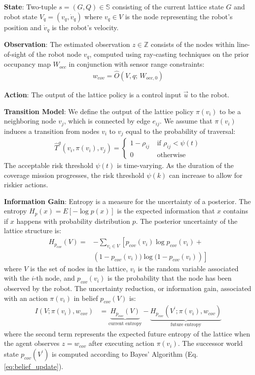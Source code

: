 \documentclass[letterpaper]{article} %
\newcommand{\ph}[1]{{\textbf{#1}:}} %
\begin{document}
\ph{State} Two-tuple $s=(G, Q)  \in \mathbb{S}$ consisting of the current lattice state $G$ and robot state $V_q = (v_q, \dot{v}_q)$ where $v_q \in V$ is the node representing the robot's position and $\dot{v}_q$ is the robot's velocity. 

\ph{Observation} The estimated observation $z \in \mathbb{Z}$ consists of the nodes within line-of-sight of the robot node $v_q$, computed using ray-casting techniques on the prior occupancy map $W_{occ}$ in conjunction with sensor range constraints:
\begin{align}
    w_{cov} = \hat{O}(V, q; \, W_{occ,0}) 
\end{align}

\ph{Action} The output of the lattice policy is a control input $\vec{u}$ to the robot. 

\ph{Transition Model} We define the output of the lattice policy $\pi(v_i)$ to be a neighboring node $v_j$, which is connected by edge $e_{ij}$. We assume that $\pi(v_i)$ induces a transition from nodes $v_i$ to $v_j$ equal to the probability of traversal:
\begin{align}
    \hat{T}^{g} (v_i, \pi(v_i), v_j) = \begin{cases} 
    1-\rho_{ij} \; &\text{if $\rho_{ij} < \psi(t)$}\\
    0 \; &\text{otherwise}
    \end{cases}
\end{align}
The acceptable risk threshold $\psi(t)$ is time-varying. As the duration of the coverage mission progresses, the risk threshold $\psi(k)$ can increase to allow for riskier actions.

\ph{Information Gain} Entropy is a measure for the uncertainty of a posterior. The entropy $H_p(x) = E[-\log p(x)]$ is the expected information that $x$ contains if $x$ happens with probability distribution $p$. The posterior uncertainty of the lattice structure is:
\begin{align}
    H_{p_{cov}}(V) =& 
    -\sum_{v_i \in V} \left[ p_{cov}(v_i) \log p_{cov}(v_i) + \right. \nonumber \\
      & \left. \left(1-p_{cov}(v_i)) \log (1-p_{cov}(v_i)\right) \right]
\end{align}
where $V$ is the set of nodes in the lattice, $v_i$ is the random variable associated with the $i$-th node, and $p_{cov}(v_i)$ is the probability that the node has been observed by the robot. The uncertainty reduction, or information gain, associated with an action $\pi(v_i)$ in belief $p_{cov}(V)$ is:
\begin{align}
    I(V; \pi(v_i), w_{cov}) &= \underbrace{H_{p_{cov}}(V)}_\text{current entropy} - \underbrace{H_{p_{cov}}(V^\prime; \pi(v_i), w_{cov})}_\text{future entropy}
\end{align}
where the second term represents the expected future entropy of the lattice when the agent observes $z = w_{cov}$ after executing action $\pi(v_i)$. The successor world state $p_{cov}(V^\prime)$ is computed according to Bayes' Algorithm (Eq. \ref{eq:belief_update}). 
\end{document}
